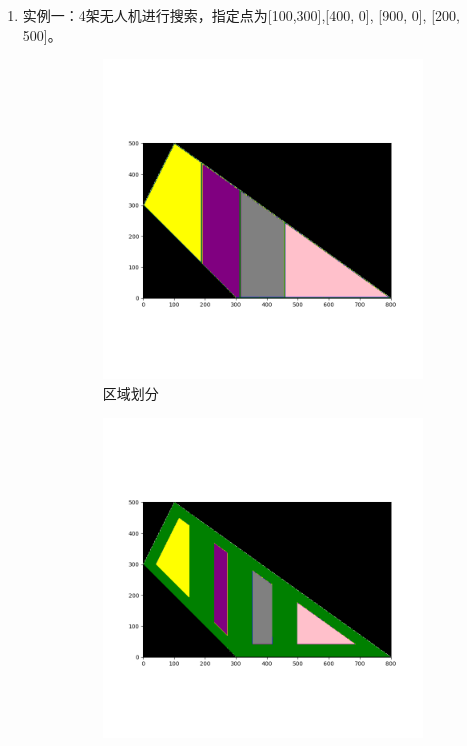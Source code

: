 \documentclass[bwprint]{gmcmthesis}
\numberwithin{figure}{section}
\begin{document}
\begin{enumerate}
	\item 实例一：4架无人机进行搜索，指定点为[100,300],[400, 0], [900, 0], [200, 500]。
	\begin{figure}[h]
		\centering
		\begin{subfigure}{0.5\textwidth}  %
			\centering
			\includegraphics[width=\textwidth]{../assets/img/1.png}  %
			\caption{区域划分}
		\end{subfigure}\hfill
		\begin{subfigure}{0.5\textwidth}  %
			\centering
			\includegraphics[width=\textwidth]{../assets/img/2.png}  %

\end{subfigure}
\end{figure}
\end{enumerate}
\end{document}
